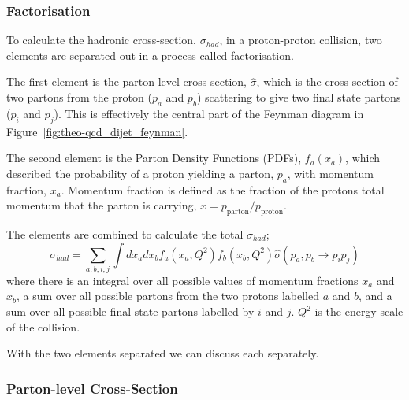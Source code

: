 \subsubsection{Factorisation}

To calculate the hadronic cross-section, $\sigma_{had}$, in a proton-proton collision,
two elements are separated out in a process called factorisation.

The first element is the parton-level cross-section, $\hat{\sigma}$, which is the cross-section of
two partons from the proton ($p_a$ and $p_b$) scattering to give two final state partons ($p_i$ and $p_j$).
This is effectively the central part of the Feynman diagram in Figure~\ref{fig:theo-qcd_dijet_feynman}.

The second element is the Parton Density Functions (PDFs), $f_a(x_a)$, which described the probability of
a proton yielding a parton, $p_a$, with momentum fraction, $x_a$.
Momentum fraction is defined as the fraction of the protons total momentum that the parton is carrying, $x = p_{\text{parton}}/p_{\text{proton}}$.

The elements are combined to calculate the total $\sigma_{had}$;
\begin{equation}
  \sigma_{had} = \sum_{a,b,i,j} \int dx_a dx_b f_a(x_a,Q^2)f_b(x_b,Q^2) \hat{\sigma}(p_a, p_b\to p_i p_j)
\end{equation}
where there is an integral over all possible values of momentum fractions $x_a$ and $x_b$,
a sum over all possible partons from the two protons labelled $a$ and $b$,
and a sum over all possible final-state partons labelled by $i$ and $j$.
$Q^2$ is the energy scale of the collision.

With the two elements separated we can discuss each separately.

\subsubsection{Parton-level Cross-Section}
\label{sec:theo-qcd_dijet_xs}

